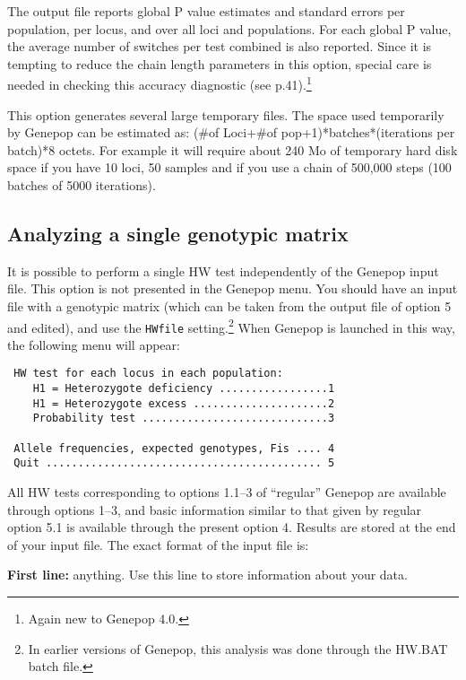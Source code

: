 \documentclass[12pt,]{book}
\let\rmarkdownfootnote\footnote%
\def\footnote{\protect\rmarkdownfootnote}
\begin{document}
The output file reports global P value estimates and standard errors per
population, per locus, and over all loci and populations. For each
global P value, the average number of switches per test combined is also
reported. Since it is tempting to reduce the chain length parameters in
this option, special care is needed in checking this accuracy diagnostic
(see p.41).\footnote{Again new to Genepop 4.0.}

This option generates several large temporary files. The space used
temporarily by Genepop can be estimated as: (\#of Loci+\#of
pop+1)*batches*(iterations per batch)*8 octets. For example it will
require about 240 Mo of temporary hard disk space if you have 10 loci,
50 samples and if you use a chain of 500,000 steps (100 batches of 5000
iterations).

\subsection{Analyzing a single genotypic
matrix}\label{analyzing-a-single-genotypic-matrix}

 It is possible to perform a
single HW test independently of the Genepop input file. This option is
not presented in the Genepop menu. You should have an input file with a
genotypic matrix (which can be taken from the output file of option 5
and edited), and use the \texttt{HWfile}
setting.\footnote{In earlier versions of Genepop, this
  analysis was done through the HW.BAT batch file.} When Genepop is
launched in this way, the following menu will appear:

\begin{verbatim}
 HW test for each locus in each population:
    H1 = Heterozygote deficiency .................1
    H1 = Heterozygote excess .....................2
    Probability test .............................3

 Allele frequencies, expected genotypes, Fis .... 4
 Quit ........................................... 5
\end{verbatim}

All HW tests corresponding to options 1.1--3 of ``regular'' Genepop are
available through options 1--3, and basic information similar to that
given by regular option 5.1 is available through the present option 4.
Results are stored at the end of your input file. The exact format of
the input file is:

\textbf{First line:} anything. Use this line to store information about
your data.
\end{document}

